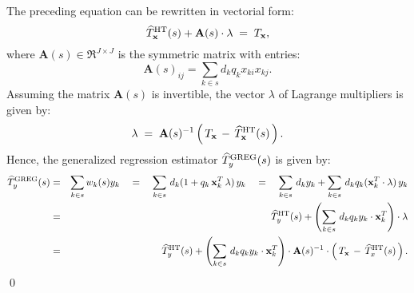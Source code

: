 \documentclass{article}
\begin{document}
The preceding equation can be rewritten in vectorial form:
\begin{equation*}
\widehat{T}^{\textnormal{HT}}_{\mathbf{x}}(s) + \mathbf{A}(s)\cdot\mathbf{\lambda} \; = \; T_{\mathbf{x}},
\end{equation*}
where $\mathbf{A}(s) \in \Re^{J \times J}$ is the symmetric matrix with entries:
\begin{equation*}
\mathbf{A}(s)_{ij} = \sum_{k \in s}d_{k}q_{k}x_{ki}x_{kj}.
\end{equation*}
{\color{red}Assuming the matrix $\mathbf{A}(s)$ is invertible}, the vector $\lambda$ of Lagrange multipliers
is given by:
\begin{equation*}
\mathbf{\lambda} \;=\; \mathbf{A}(s)^{-1}\left(\,T_{\mathbf{x}} \,-\, \widehat{T}^{\textnormal{HT}}_{\mathbf{x}}(s)\,\right).
\end{equation*}
Hence, the generalized regression estimator $\widehat{T}^{\textnormal{GREG}}_{y}(s)$
is given by:
\begin{eqnarray*}
\widehat{T}^{\textnormal{GREG}}_{y}(s)
&=& \sum_{k \in s}w_{k}(s)y_{k}
\quad = \quad \sum_{k \in s}\,d_{k}(1 + q_{k}\,\mathbf{x}_{k}^{T}\,\mathbf{\lambda})\,y_{k}
\quad = \quad \sum_{k \in s}\,d_{k}y_{k} + \sum_{k \in s}\,d_{k}q_{k}(\mathbf{x}_{k}^{T}\cdot\mathbf{\lambda})\,y_{k}\\
&=& \widehat{T}^{\textnormal{HT}}_{y}(s) + \left(\sum_{k \in s}\,d_{k}q_{k}y_{k}\cdot\mathbf{x}_{k}^{T}\right)\cdot\mathbf{\lambda}\\
&=& \widehat{T}^{\textnormal{HT}}_{y}(s) + \left(\sum_{k \in s}\,d_{k}q_{k}y_{k}\cdot\mathbf{x}_{k}^{T}\right)\cdot\mathbf{A}(s)^{-1}\cdot\left(\,T_{\mathbf{x}} \,-\, \widehat{T}^{\textnormal{HT}}_{x}(s)\,\right).
\end{eqnarray*}
\qed
\end{document}
